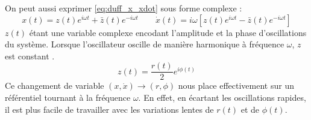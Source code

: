 On peut aussi exprimer \eqref{eq:duff_x_xdot} sous forme complexe :
\begin{equation}
    x(t) = z(t)e^{i\omega t} + \bar{z}(t) e^{-i\omega t}
    \qquad 
    \dot{x}(t) = i\omega \left[ z(t)e^{i\omega t} - \bar{z}(t) e^{-i\omega t} \right]
    \label{eq:duff_x_xdot_exp}
\end{equation}
%
$z(t)$ étant une variable complexe encodant l'amplitude et la phase d'oscillations du système. Lorsque l'oscillateur oscille de manière harmonique à fréquence $\omega$, $z$ est constant \cite{pistolesi_duffing_nodate}.
\[ z(t) = \frac{r(t)}{2}e^{i\phi(t)} \]
%
Ce changement de variable $(x, \dot{x}) \to (r, \phi)$ nous place effectivement sur un référentiel tournant à la fréquence $\omega$. 
En effet, en écartant les oscillations rapides, il est plus facile de travailler avec les variations lentes de $r(t)$ et de $\phi(t)$. 

